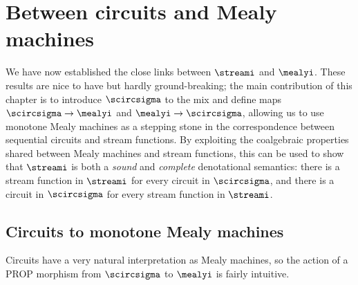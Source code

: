 \section{Between circuits and Mealy machines}

We have now established the close links between \(\streami\) and \(\mealyi\).
These results are nice to have but hardly ground-breaking; the main contribution
of this chapter is to introduce \(\scircsigma\) to the mix and define maps
\(\scircsigma \to \mealyi\) and \(\mealyi \to \scircsigma\), allowing us to use
monotone Mealy machines as a stepping stone in the correspondence between
sequential circuits and stream functions.
By exploiting the coalgebraic properties shared between Mealy machines and
stream functions, this can be used to show that \(\streami\) is both a
\emph{sound} and \emph{complete} denotational semantics: there is a stream
function in \(\streami\) for every circuit in \(\scircsigma\), and there is a
circuit in \(\scircsigma\) for every stream function in \(\streami\).

\subsection{Circuits to monotone Mealy machines}

Circuits have a very natural interpretation as Mealy machines, so the action
of a PROP morphism from \(\scircsigma\) to \(\mealyi\) is fairly intuitive.

